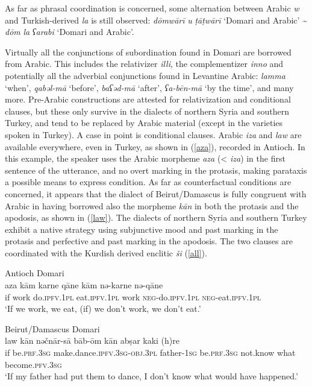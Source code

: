 \documentclass[output=paper]{langsci/langscibook}
\begin{document}
As far as phrasal coordination is concerned, some alternation between Arabic \textit{w} and Turkish-derived \textit{la} is still observed: \textit{dōmwārī} \textit{u} \textit{ṭāṭwārī} ‘Domari and Arabic’ {\textasciitilde} \textit{dōm} \textit{la} \textit{ʕarabi} ‘Domari and Arabic’.

Virtually all the conjunctions of subordination found in Domari are borrowed from Arabic. This includes the relativizer \textit{illi}, the complementizer \textit{inno} and potentially all the adverbial conjunctions found in Levantine Arabic: \textit{lamma} ‘when’, \textit{qabəl-mā} ‘before’, \textit{baʕəd-mā} ‘after’, \textit{ʕa-bēn-mā} ‘by the time’, and many more. Pre-Arabic constructions are attested for relativization and conditional clauses, but these only survive in the dialects of northern Syria and southern Turkey, and tend to be replaced by Arabic material (except in the varieties spoken in Turkey). A case in point is conditional clauses. Arabic \textit{iza} and \textit{law} are available everywhere, even in Turkey, as shown in (\ref{aza}), recorded in Antioch. In this example, the speaker uses the Arabic morpheme \textit{aza} (< \textit{iza}) in the first sentence of the utterance, and no overt marking in the protasis, making parataxis a possible means to express condition. As far as counterfactual conditions are concerned, it appears that the dialect of Beirut/Damascus is fully congruent with Arabic in having borrowed also the morpheme \textit{kān} in both the protasis and the apodosis, as shown in (\ref{law}). The dialects of northern Syria and southern Turkey exhibit a native strategy using subjunctive mood and past marking in the protasis and perfective and past marking in the apodosis. The two clauses are coordinated with the Kurdish derived enclitic \textit{ši} (\ref{all}).

\ea \label{aza}
{Antioch Domari}\\
\gll aza kām karne qāne kām nə-karne nə-qāne\\
     if work do.\textsc{ipfv.1pl} eat.\textsc{ipfv.1pl} work \textsc{neg}{}-do.\textsc{ipfv.1pl} \textsc{neg}{}-eat.\textsc{ipfv.1pl}\\
\glt ‘If we work, we eat, (if) we don’t work, we don’t eat.’
\z

\ea \label{law}
{Beirut/Damascus Domari}\\
\gll law kān nəčnār-sā bāb-ōm kān abṣar kaki (h)re\\
     if be.\textsc{prf.3sg} make.dance\textsc{.ipfv.3sg-obj.3pl} father-\textsc{1sg} be.\textsc{prf.3sg} not.know what become.\textsc{pfv.3sg}\\
\glt ‘If my father had put them to dance, I don’t know what would have happened.’
\z
{}
\end{document}
